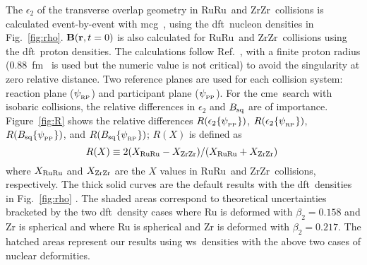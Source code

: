 \documentclass[3p,times,procedia]{elsarticle}
\newcommand {\dft}	{{\sc dft}}
\newcommand {\mcg}	{{\sc mcg}}
\newcommand {\ws}	{{\sc ws}}
\newcommand {\cme}	{{\mbox{\sc cme}}}
\newcommand {\RP}	{{\sc rp}}
\newcommand {\PP}	{{\sc pp}}
\newcommand {\psiRP}	{\psi_{_{\rm RP}}}
\newcommand {\psiPP}	{\psi_{_{\rm PP}}}
\newcommand {\etwo}	{\epsilon_2}
\newcommand {\epsi}	{\etwo\{\psi\}}
\newcommand {\eRP}	{\etwo\{\psiRP\}}
\newcommand {\ePP}	{\etwo\{\psiPP\}}
\newcommand {\rbf}	{{\bf r}}
\newcommand {\RuRu}	{RuRu}
\newcommand {\ZrZr}	{ZrZr}
\newcommand {\Bbf}	{\mathbf{B}}
\newcommand {\Bsq}	{B_{\rm sq}}
\newcommand {\Bpsi}	{\Bsq\{\psi\}}
\newcommand {\BRP}	{\Bsq\{\psiRP\}}
\newcommand {\BPP}	{\Bsq\{\psiPP\}}
\begin{document}
The $\etwo$ of the transverse overlap geometry in \RuRu\ and \ZrZr\ collisions is calculated event-by-event with \mcg~\cite{Xu:2014ada}, using the \dft\ nucleon densities in Fig.~\ref{fig:rho}.
$\Bbf(\rbf,t=0)$ is also calculated %
for \RuRu\ and \ZrZr\ collisions using the \dft\ proton densities. The calculations follow Ref.~\cite{Deng:2012pc}, with a finite proton radius (0.88~fm~ is used but the numeric value is not critical) to avoid the singularity at zero relative distance.  %
Two reference planes are used for each collision system: reaction plane ($\psiRP$) and participant plane ($\psiPP$).
For the \cme\ search with isobaric collisions, the relative differences in $\etwo$ and $\Bsq$ are of importance. Figure~\ref{fig:R} shows the relative differences $R(\ePP)$, $R(\eRP)$, $R(\BPP)$, and $R(\BRP)$; $R(X)$ is defined as
\begin{equation}
R(X)\equiv2(X_{\rm\RuRu}-X_{\rm\ZrZr})/(X_{\rm\RuRu}+X_{\rm\ZrZr})\;
\end{equation}
where $X_{\rm\RuRu}$ and $X_{\rm\ZrZr}$ are the $X$ values in \RuRu\ and \ZrZr\ collisions, respectively. The thick solid curves are the default results with the \dft\ densities in Fig.~\ref{fig:rho} . %
The shaded areas correspond to theoretical uncertainties bracketed by the two \dft\ density cases where Ru is deformed with $\beta_2=0.158$ and Zr is spherical and where Ru is spherical and Zr is deformed with $\beta_2=0.217$. 
The hatched areas represent our results using \ws\ densities with the above two cases of nuclear deformities.
\end{document}
